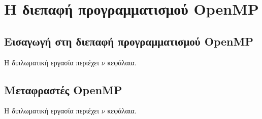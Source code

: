 \chapter{Η διεπαφή προγραμματισμού OpenMP}
\label{ch:OpenMP API}


\section{Εισαγωγή στη διεπαφή προγραμματισμού OpenMP}
\label{sec:Introduction to OpenMP API}
Η διπλωματική εργασία περιέχει $\nu$ κεφάλαια.

\section{Μεταφραστές OpenMP}
\label{sec:OpenMP Compilers}
Η διπλωματική εργασία περιέχει $\nu$ κεφάλαια.

